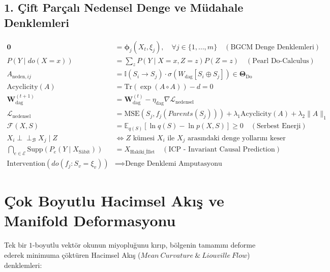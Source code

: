 \documentclass[11pt, a4paper]{article}
\begin{document}
\subsection{1. Çift Parçalı Nedensel Denge ve Müdahale Denklemleri}
\begin{align}
\mathbf{0} &= \bm{\phi}_j(X_t, \xi_j), \quad \forall j \in \{1, \dots, m\} \quad (\text{BGCM Denge Denklemleri}) \\
P(Y \mid do(X = x)) &= \sum_z P(Y \mid X = x, Z = z) P(Z = z) \quad (\text{Pearl Do-Calculus}) \\
A_{\text{neden}, ij} &= \mathbb{I}(S_i \to S_j) \cdot \sigma(W_{\text{dag}} [S_i \oplus S_j]) \in \bm{\Theta}_{\text{Do}} \\
\text{Acyclicity}(A) &= \text{Tr}(\exp(A \circ A)) - d = 0 \\
\mathbf{W}_{\text{dag}}^{(t+1)} &= \mathbf{W}_{\text{dag}}^{(t)} - \eta_{\text{dag}} \nabla \mathcal{L}_{\text{nedensel}} \\
\mathcal{L}_{\text{nedensel}} &= \text{MSE}(S_j, f_j(Parents(S_j))) + \lambda_1 \text{Acyclicity}(A) + \lambda_2 \|A\|_1 \\
\mathcal{F}(X, S) &= \mathbb{E}_{q(S)} \left[ \ln q(S) - \ln p(X, S) \right] \ge 0 \quad (\text{Serbest Enerji}) \\
X_i \perp\!\!\!\perp_{\mathcal{B}} X_j \mid Z &\iff Z \text{ kümesi } X_i \text{ ile } X_j \text{ arasındaki denge yollarını keser} \\
\bigcap_{e \in \mathcal{E}} \text{Supp}\left( P_e(Y \mid X_{\text{Sâbit}}) \right) &= X_{\text{Hakiki\_İllet}} \quad (\text{ICP - Invariant Causal Prediction}) \\
\text{Intervention}(do(f_j : S_v = \xi_v)) &\implies \text{Denge Denklemi Amputasyonu}
\end{align}

\section{Çok Boyutlu Hacimsel Akış ve Manifold Deformasyonu}

Tek bir $1$-boyutlu vektör okunun miyopluğunu kırıp, bölgenin tamamını deforme ederek minimuma çöktüren Hacimsel Akış ($Mean\ Curvature\ \&\ Liouville\ Flow$) denklemleri:
\end{document}
